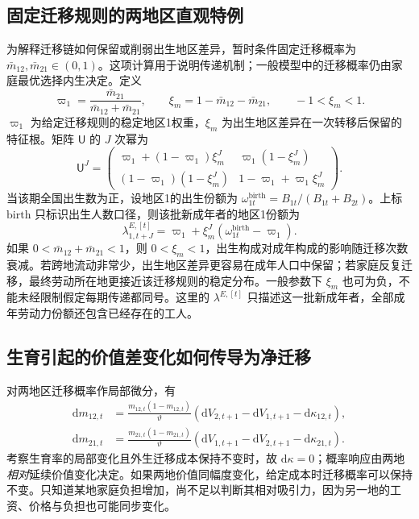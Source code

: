 \documentclass[UTF8,a4paper,zihao=-4,fontset=windows]{ctexart}
\numberwithin{equation}{section}
\newcommand{\dd}{\mathrm{d}}
\begin{document}
\subsection{固定迁移规则的两地区直观特例}
为解释迁移链如何保留或削弱出生地区差异，暂时条件固定迁移概率为 $\bar m_{12},\bar m_{21}\in(0,1)$。这项计算用于说明传递机制；一般模型中的迁移概率仍由家庭最优选择内生决定。定义
\begin{equation}
 \varpi_1=\frac{\bar m_{21}}{\bar m_{12}+\bar m_{21}},\qquad
 \xi_m=1-\bar m_{12}-\bar m_{21},\qquad -1<\xi_m<1.
\end{equation}
$\varpi_1$ 为给定迁移规则的稳定地区1权重，$\xi_m$ 为出生地区差异在一次转移后保留的特征根。矩阵 $\mathsf U$ 的 $J$ 次幂为
\begin{equation}
 \mathsf U^J=\begin{pmatrix}
 \varpi_1+(1-\varpi_1)\xi_m^J&\varpi_1(1-\xi_m^J)\\
 (1-\varpi_1)(1-\xi_m^J)&1-\varpi_1+\varpi_1\xi_m^J
 \end{pmatrix}.
 \label{eq:two-region-markov-power}
\end{equation}
当该期全国出生数为正，设地区1的出生份额为 $\omega^{\mathrm{birth}}_{1t}=B_{1t}/(B_{1t}+B_{2t})$。上标 $\mathrm{birth}$ 只标识出生人数口径，则该批新成年者的地区1份额为
\begin{equation}
 \lambda^{E,[t]}_{1,t+J}=\varpi_1+\xi_m^J(\omega^{\mathrm{birth}}_{1t}-\varpi_1).
 \label{eq:birth-share-to-entrant-share}
\end{equation}
如果 $0<\bar m_{12}+\bar m_{21}<1$，则 $0<\xi_m<1$，出生构成对成年构成的影响随迁移次数衰减。若跨地流动非常少，出生地区差异更容易在成年人口中保留；若家庭反复迁移，最终劳动所在地更接近该迁移规则的稳定分布。一般参数下 $\xi_m$ 也可为负，不能未经限制假定每期传递都同号。这里的 $\lambda^{E,[t]}$ 只描述这一批新成年者，全部成年劳动力份额还包含已经存在的工人。

\subsection{生育引起的价值差变化如何传导为净迁移}
对两地区迁移概率作局部微分，有
\begin{align}
 \dd m_{12,t}&=\frac{m_{12,t}(1-m_{12,t})}{\vartheta}
 \left(\dd V_{2,t+1}-\dd V_{1,t+1}-\dd\kappa_{12,t}\right),\\
 \dd m_{21,t}&=\frac{m_{21,t}(1-m_{21,t})}{\vartheta}
 \left(\dd V_{1,t+1}-\dd V_{2,t+1}-\dd\kappa_{21,t}\right).
 \label{eq:migration-value-differential}
\end{align}
考察生育率的局部变化且外生迁移成本保持不变时，故 $\dd\kappa=0$；概率响应由两地\emph{相对}延续价值变化决定。如果两地价值同幅度变化，给定成本时迁移概率可以保持不变。只知道某地家庭负担增加，尚不足以判断其相对吸引力，因为另一地的工资、价格与负担也可能同步变化。
\end{document}
